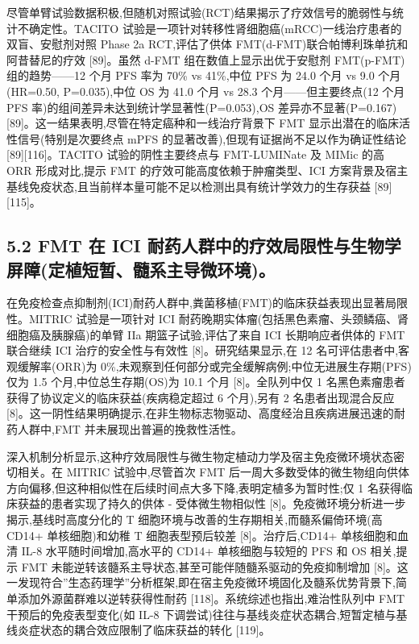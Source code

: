 \documentclass[11pt]{article}
\begin{document}
尽管单臂试验数据积极,但随机对照试验(RCT)结果揭示了疗效信号的脆弱性与统计不确定性。TACITO 试验是一项针对转移性肾细胞癌(mRCC)一线治疗患者的双盲、安慰剂对照 Phase 2a RCT,评估了供体 FMT(d-FMT)联合帕博利珠单抗和阿昔替尼的疗效 {[}89{]}。虽然 d-FMT 组在数值上显示出优于安慰剂 FMT(p-FMT)组的趋势------12 个月 PFS 率为 70\% vs 41\%,中位 PFS 为 24.0 个月 vs 9.0 个月(HR=0.50, P=0.035),中位 OS 为 41.0 个月 vs 28.3 个月------但主要终点(12 个月 PFS 率)的组间差异未达到统计学显著性(P=0.053),OS 差异亦不显著(P=0.167){[}89{]}。这一结果表明,尽管在特定癌种和一线治疗背景下 FMT 显示出潜在的临床活性信号(特别是次要终点 mPFS 的显著改善),但现有证据尚不足以作为确证性结论 {[}89{]}{[}116{]}。TACITO 试验的阴性主要终点与 FMT-LUMINate 及 MIMic 的高 ORR 形成对比,提示 FMT 的疗效可能高度依赖于肿瘤类型、ICI 方案背景及宿主基线免疫状态,且当前样本量可能不足以检测出具有统计学效力的生存获益 {[}89{]}{[}115{]}。

\subsection{5.2 FMT 在 ICI 耐药人群中的疗效局限性与生物学屏障(定植短暂、髓系主导微环境)。}\label{fmt-ux5728-ici-ux8010ux836fux4ebaux7fa4ux4e2dux7684ux7597ux6548ux5c40ux9650ux6027ux4e0eux751fux7269ux5b66ux5c4fux969cux5b9aux690dux77edux6682ux9ad3ux7cfbux4e3bux5bfcux5faeux73afux5883}

在免疫检查点抑制剂(ICI)耐药人群中,粪菌移植(FMT)的临床获益表现出显著局限性。MITRIC 试验是一项针对 ICI 耐药晚期实体瘤(包括黑色素瘤、头颈鳞癌、肾细胞癌及胰腺癌)的单臂 IIa 期篮子试验,评估了来自 ICI 长期响应者供体的 FMT 联合继续 ICI 治疗的安全性与有效性 {[}8{]}。研究结果显示,在 12 名可评估患者中,客观缓解率(ORR)为 0\%,未观察到任何部分或完全缓解病例;中位无进展生存期(PFS)仅为 1.5 个月,中位总生存期(OS)为 10.1 个月 {[}8{]}。全队列中仅 1 名黑色素瘤患者获得了协议定义的临床获益(疾病稳定超过 6 个月),另有 2 名患者出现混合反应 {[}8{]}。这一阴性结果明确提示,在非生物标志物驱动、高度经治且疾病进展迅速的耐药人群中,FMT 并未展现出普遍的挽救性活性。

深入机制分析显示,这种疗效局限性与微生物定植动力学及宿主免疫微环境状态密切相关。在 MITRIC 试验中,尽管首次 FMT 后一周大多数受体的微生物组向供体方向偏移,但这种相似性在后续时间点大多下降,表明定植多为暂时性;仅 1 名获得临床获益的患者实现了持久的供体 - 受体微生物相似性 {[}8{]}。免疫微环境分析进一步揭示,基线时高度分化的 T 细胞环境与改善的生存期相关,而髓系偏倚环境(高 CD14+ 单核细胞)和幼稚 T 细胞表型预后较差 {[}8{]}。治疗后,CD14+ 单核细胞和血清 IL-8 水平随时间增加,高水平的 CD14+ 单核细胞与较短的 PFS 和 OS 相关,提示 FMT 未能逆转该髓系主导状态,甚至可能伴随髓系驱动的免疫抑制增加 {[}8{]}。这一发现符合''生态药理学''分析框架,即在宿主免疫微环境固化及髓系优势背景下,简单添加外源菌群难以逆转获得性耐药 {[}118{]}。系统综述也指出,难治性队列中 FMT 干预后的免疫表型变化(如 IL-8 下调尝试)往往与基线炎症状态耦合,短暂定植与基线炎症状态的耦合效应限制了临床获益的转化 {[}119{]}。
\end{document}
